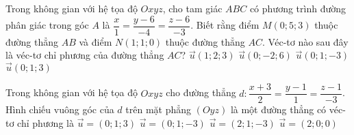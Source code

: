 	\begin{ex}%
	Trong không gian với hệ tọa độ $Oxyz$, cho tam giác $ABC$ có phương trình đường phân giác trong góc $A$ là $\dfrac{x}{1} = \dfrac{y - 6}{-4} = \dfrac{z - 6}{-3}$. Biết rằng điểm $M(0; 5; 3)$ thuộc đường thẳng $AB$ và điểm $N(1; 1; 0)$ thuộc đường thẳng $AC$. Véc-tơ nào sau đây là véc-tơ chỉ phương của đường thẳng $AC$?
	\choice
	{$\overrightarrow{u}(1; 2; 3)$}
	{$\overrightarrow{u}(0; -2; 6)$}
	{$\overrightarrow{u}(0; 1; -3)$}
	{\True $\overrightarrow{u}(0; 1; 3)$}
	\end{ex}
	\begin{ex}%
	Trong không gian với hệ tọa độ $Oxyz$ cho đường thẳng $d \colon \dfrac{x+3}{2} = \dfrac{y-1}{1}=\dfrac{z-1}{-3}$. Hình chiếu vuông góc của $d$ trên mặt phẳng $(Oyz)$ là một đường thẳng có véc-tơ chỉ phương là
	\choice
	{$\overrightarrow{u}=(0;1;3)$}
	{\True $\overrightarrow{u}=(0;1;-3)$}
	{$\overrightarrow{u}=(2;1;-3)$}
	{$\overrightarrow{u}=(2;0;0)$}
	\end{ex}
